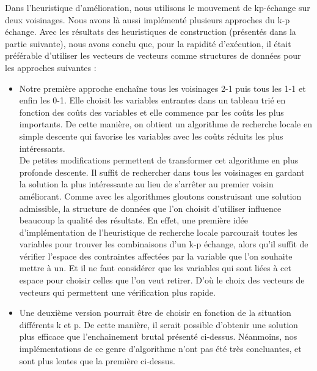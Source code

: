 %
%

\vspace{5mm}
\noindent
{}
\vspace{2mm}

Dans l'heuristique d'amélioration, nous utilisons le mouvement de kp-échange sur deux voisinages. Nous avons là aussi implémenté plusieurs approches du k-p échange. Avec les résultats des heuristiques de construction (présentés dans la partie suivante), nous avons conclu que, pour la rapidité d'exécution, il était préférable d'utiliser les vecteurs de vecteurs comme structures de données pour les approches suivantes : 
\begin{itemize}
\item Notre première approche enchaîne tous les voisinages 2-1 puis tous les 1-1 et enfin les 0-1.
  Elle choisit les variables entrantes dans un tableau trié en fonction des coûts des variables et elle commence par les coûts les plus importants. De cette manière, on obtient un algorithme de recherche locale en simple descente qui favorise les variables avec les coûts réduits les plus intéressants. \\ De petites modifications permettent de transformer cet algorithme en plus profonde descente. Il suffit de rechercher dans tous les voisinages en gardant la solution la plus intéressante au lieu de s'arrêter au premier voisin améliorant.
  Comme avec les algorithmes gloutons construisant une solution admissible, la structure de données que l'on choisit d'utiliser influence beaucoup la qualité des résultats. En effet, une première idée d'implémentation de l'heuristique de recherche locale parcourait toutes les variables pour trouver les combinaisons d'un k-p échange, alors qu'il suffit de vérifier l'espace des contraintes affectées par la variable que l'on souhaite mettre à un. Et il ne faut considérer que les variables qui sont liées à cet espace pour choisir celles que l'on veut retirer. D'où le choix des vecteurs de vecteurs qui permettent une vérification plus rapide.
\item Une deuxième version pourrait être de choisir en fonction de la situation différents k et p. De cette manière, il serait possible d'obtenir une solution plus efficace que l'enchainement brutal présenté ci-dessus. Néanmoins, nos implémentations de ce genre d'algorithme n'ont pas été très concluantes, et sont plus lentes que la première ci-dessus.
\end{itemize}


